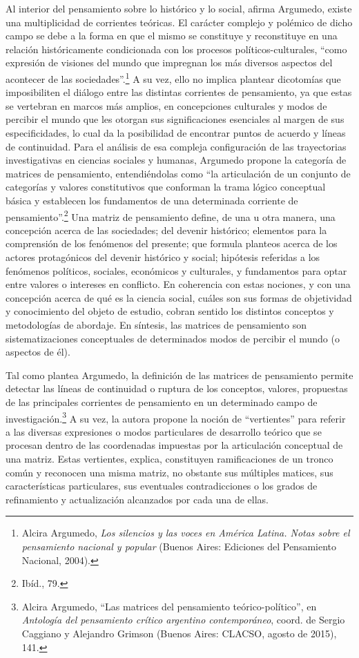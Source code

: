\documentclass{tufte-handout}
\begin{document}
Al interior del pensamiento sobre lo histórico y lo social, afirma
Argumedo, existe una multiplicidad de corrientes teóricas. El carácter
complejo y polémico de dicho campo se debe a la forma en que el mismo se
constituye y reconstituye en una relación históricamente condicionada
con los procesos políticos-culturales, ``como expresión de visiones del
mundo que impregnan los más diversos aspectos del acontecer de las
sociedades''.\footnote{Alcira Argumedo, \emph{Los silencios y las voces
  en América Latina. Notas sobre el pensamiento nacional y popular}
  (Buenos Aires: Ediciones del Pensamiento Nacional, 2004).} A su vez,
ello no implica plantear dicotomías que imposibiliten el diálogo entre
las distintas corrientes de pensamiento, ya que estas se vertebran en
marcos más amplios, en concepciones culturales y modos de percibir el
mundo que les otorgan sus significaciones esenciales al margen de sus
especificidades, lo cual da la posibilidad de encontrar puntos de
acuerdo y líneas de continuidad. Para el análisis de esa compleja
configuración de las trayectorias investigativas en ciencias sociales y
humanas, Argumedo propone la categoría de matrices de pensamiento,
entendiéndolas como ``la articulación de un conjunto de categorías y
valores constitutivos que conforman la trama lógico conceptual básica y
establecen los fundamentos de una determinada corriente de
pensamiento''.\footnote{Ibíd., 79.} Una matriz de pensamiento define, de
una u otra manera, una concepción acerca de las sociedades; del devenir
histórico; elementos para la comprensión de los fenómenos del presente;
que formula planteos acerca de los actores protagónicos del devenir
histórico y social; hipótesis referidas a los fenómenos políticos,
sociales, económicos y culturales, y fundamentos para optar entre
valores o intereses en conflicto. En coherencia con estas nociones, y
con una concepción acerca de qué es la ciencia social, cuáles son sus
formas de objetividad y conocimiento del objeto de estudio, cobran
sentido los distintos conceptos y metodologías de abordaje. En síntesis,
las matrices de pensamiento son sistematizaciones conceptuales de
determinados modos de percibir el mundo (o aspectos de él).

Tal como plantea Argumedo, la definición de las matrices de pensamiento
permite detectar las líneas de continuidad o ruptura de los conceptos,
valores, propuestas de las principales corrientes de pensamiento en un
determinado campo de investigación.\footnote{Alcira Argumedo, ``Las
  matrices del pensamiento teórico-político'', en \emph{Antología del
  pensamiento crítico argentino contemporáneo}, coord. de Sergio
  Caggiano y Alejandro Grimson (Buenos Aires: CLACSO, agosto de 2015),
  141.} A su vez, la autora propone la noción de ``vertientes'' para
referir a las diversas expresiones o modos particulares de desarrollo
teórico que se procesan dentro de las coordenadas impuestas por la
articulación conceptual de una matriz. Estas vertientes, explica,
constituyen ramificaciones de un tronco común y reconocen una misma
matriz, no obstante sus múltiples matices, sus características
particulares, sus eventuales contradicciones o los grados de
refinamiento y actualización alcanzados por cada una de ellas.
\end{document}

